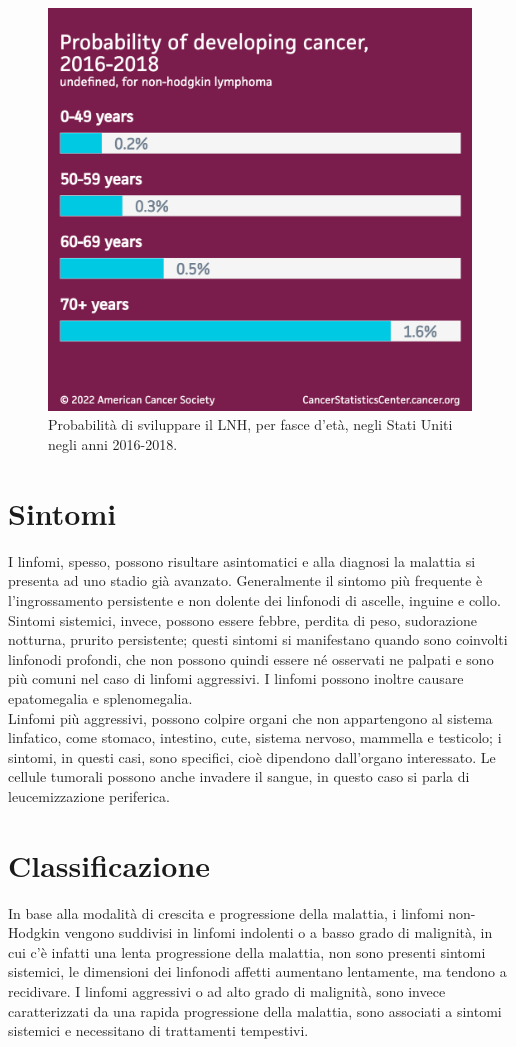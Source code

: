 \begin{figure}[H]
    \begin{center}
    \includegraphics[width=0.4\columnwidth]{img/Probabilityofdevelopingcancer.png}
    \vspace{-3mm}
    \end{center}
    \caption{Probabilità di sviluppare il LNH, per fasce d’età, negli Stati Uniti negli anni 2016-2018.
    \cite{Americanstatistic}}

\end{figure}

\section{Sintomi}
I linfomi, spesso, possono risultare asintomatici e alla diagnosi la malattia si presenta ad uno stadio già avanzato.
Generalmente il sintomo più frequente è l’ingrossamento persistente e non dolente dei linfonodi di ascelle, inguine e 
collo\cite{LNHAIL}.\\ 
Sintomi sistemici, invece, possono essere febbre, perdita di peso, sudorazione notturna, prurito persistente; 
questi sintomi si manifestano quando sono coinvolti linfonodi profondi, che non possono quindi essere né osservati 
ne palpati e sono più comuni nel caso di linfomi aggressivi. I linfomi possono inoltre causare epatomegalia e 
splenomegalia\cite{AMERICANCANCER}.\\ 
Linfomi più aggressivi, possono colpire organi che non appartengono al sistema linfatico, come stomaco, intestino, 
cute, sistema nervoso, mammella e testicolo; i sintomi, in questi casi, sono specifici, cioè dipendono 
dall’organo interessato\cite{AMERICANCANCER}.
Le cellule tumorali possono anche invadere il sangue, in questo caso si parla di leucemizzazione periferica\cite{LNHAIL}.


\section{Classificazione}
In base alla modalità di crescita e progressione della malattia, i linfomi non-Hodgkin vengono suddivisi in 
linfomi indolenti o a basso grado di malignità, in cui c’è infatti una lenta progressione della malattia, 
non sono presenti sintomi sistemici, le dimensioni dei linfonodi affetti aumentano lentamente, ma tendono a recidivare. 
I linfomi aggressivi o ad alto grado di malignità, sono invece caratterizzati da una rapida progressione della malattia, 
sono associati a sintomi sistemici e necessitano di trattamenti tempestivi\cite{reteveneta}.\\

